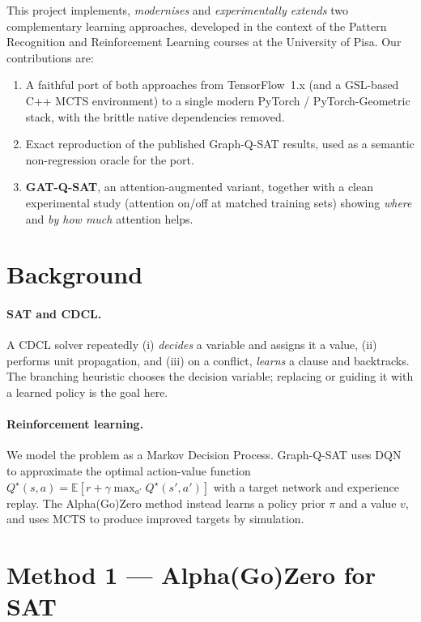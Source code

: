\documentclass[11pt]{article}
\begin{document}
This project implements, \emph{modernises} and \emph{experimentally extends} two
complementary learning approaches, developed in the context of the Pattern
Recognition and Reinforcement Learning courses at the University of Pisa.
Our contributions are:
\begin{enumerate}
  \item A faithful port of both approaches from TensorFlow~1.x (and a GSL-based C++
        MCTS environment) to a single modern PyTorch / PyTorch-Geometric stack, with
        the brittle native dependencies removed.
  \item Exact reproduction of the published Graph-Q-SAT results, used as a
        semantic non-regression oracle for the port.
  \item \textbf{GAT-Q-SAT}, an attention-augmented variant, together with a clean
        experimental study (attention on/off at matched training sets) showing
        \emph{where} and \emph{by how much} attention helps.
\end{enumerate}

\section{Background}
\paragraph{SAT and CDCL.} A CDCL solver repeatedly (i) \emph{decides} a variable
and assigns it a value, (ii) performs unit propagation, and (iii) on a conflict,
\emph{learns} a clause and backtracks. The branching heuristic chooses the
decision variable; replacing or guiding it with a learned policy is the goal here.

\paragraph{Reinforcement learning.} We model the problem as a Markov Decision
Process. Graph-Q-SAT uses DQN to approximate the optimal action-value function
$Q^\star(s,a)=\mathbb{E}[r+\gamma\max_{a'}Q^\star(s',a')]$ with a target network
and experience replay. The Alpha(Go)Zero method instead learns a policy prior
$\pi$ and a value $v$, and uses MCTS to produce improved targets by simulation.

\section{Method 1 --- Alpha(Go)Zero for SAT}
\end{document}
